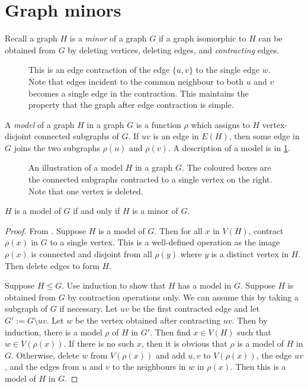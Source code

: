 \section{Graph minors}
Recall a graph \(H\) is a \textit{minor} of a graph \(G\) if a graph isomorphic to \(H\) can be obtained from \(G\) by deleting vertices, deleting edges, and \textit{contracting} edges.

\begin{figure}[h!]
	\centering
	
	\caption[Edge contraction]{This is an edge contraction of the edge $\{u, v\}$ to the single edge $w$. Note that edges incident to the common neighbour to both $u$ and $v$ becomes a single edge in the contraction. This maintains the property that the graph after edge contraction is simple.}
\end{figure}

A \textit{model} of a graph \(H\) in a graph \(G\) is a function $\rho$ which assigns to \(H\) vertex-disjoint connected subgraphs of \(G\). If $uv$ is an edge in \(E(H)\), then some edge in \(G\) joins the two subgraphs \(\rho(u)\) and \(\rho(v)\). A description of a model is in \cref{fig:model_of_P5}.
\begin{figure}[h!]
	\centering
	
	\caption[A model $H$ in a graph $G$.]{An illustration of a model $H$ in a graph $G$. The coloured boxes are the connected subgraphs contracted to a single vertex on the right. Note that one vertex is deleted.}\label{fig:model_of_P5}
\end{figure}

\begin{lemma}
	\(H\) is a model of \(G\) if and only if $H$ is a minor of $G$.
\end{lemma}

\begin{proof}
	From \textcite{norinMath599GraphMinors2017}. Suppose \(H\) is a model of \(G\). Then for all \(x\) in \(V(H)\), contract \(\rho(x)\) in \(G\) to a single vertex. This is a well-defined operation as the image $\rho(x)$ is connected and disjoint from all $\rho(y)$ where $y$ is a distinct vertex in $H$. Then delete edges to form \(H\).

	Suppose \(H \leq G\). Use induction to show that \(H\) has a model in \(G\). Suppose \(H\) is obtained from \(G\) by contraction operations only. We can assume this by taking a subgraph of \(G\) if necessary. Let \(uv\) be the first contracted edge and let \(G' := G \setminus uv\). Let \(w\) be the vertex obtained after contracting \(uv\). Then by induction, there is a model \(\rho\) of \(H\) in \(G'\). Then find $x \in V(H)$ such that $w \in V(\rho(x))$. If there is no such $x$, then it is obvious that $\rho$ is a model of $H$ in $G$. Otherwise, 
	delete \(w\) from \(V(\rho(x)) \) and add $u, v$ to $V(\rho(x))$, the edge $uv$, and the edges from $u$ and $v$ to the neighbours in $w$ in $\rho(x)$. Then this is a model of \(H\) in \(G\). 
\end{proof}